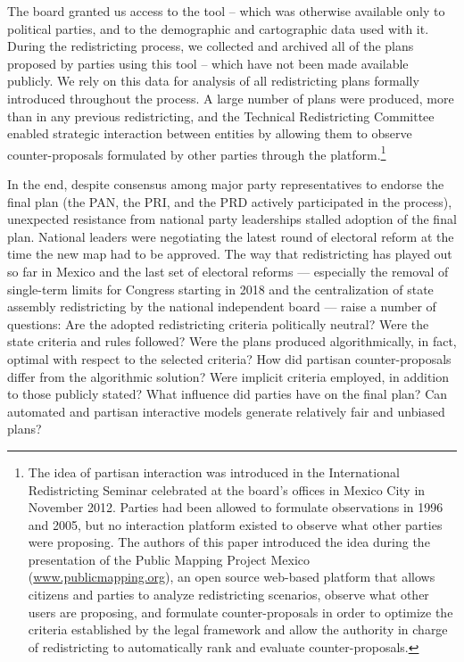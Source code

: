 \documentclass[letter,12pt]{article}
\begin{document}
The board granted us access to the tool -- which was otherwise available only to political parties, and to the demographic and cartographic data used with it. During the redistricting process, we collected and archived all of the plans proposed by parties using this tool -- which have not been made available publicly. We rely on this data for analysis of all redistricting plans formally introduced throughout the process. A large number of plans were produced, more than in any previous redistricting, and the Technical Redistricting Committee enabled strategic interaction between entities by allowing them to observe counter-proposals formulated by other parties through the platform.\footnote{The idea of partisan interaction was introduced in the International Redistricting Seminar celebrated at the board's offices in Mexico City in November 2012. Parties had been allowed to formulate observations in 1996 and 2005, but no interaction platform existed to observe what other parties were proposing. The authors of this paper introduced the idea during the presentation of the Public Mapping Project Mexico (\url{www.publicmapping.org}), an open source web-based platform that allows citizens and parties to analyze redistricting scenarios, observe what other users are proposing, and formulate counter-proposals in order to optimize the criteria established by the legal framework and allow the authority in charge of redistricting to automatically rank and evaluate counter-proposals.} 

In the end, despite consensus among major party representatives to endorse the final plan (the PAN, the PRI, and the PRD actively participated in the process), unexpected resistance from national party leaderships stalled adoption of the final plan. National leaders were negotiating the latest round of electoral reform at the time the new map had to be approved. The way that redistricting has played out so far in Mexico and the last set of electoral reforms --- especially the removal of single-term limits for Congress starting in 2018 and the centralization of state assembly redistricting by the national independent board --- raise a number of questions: Are the adopted redistricting criteria politically neutral? Were the state criteria and rules followed? Were the plans produced algorithmically, in fact, optimal with respect to the selected criteria? How did partisan counter-proposals differ from the algorithmic solution? Were implicit criteria employed, in addition to those publicly stated? What influence did parties have on the final plan? Can automated and partisan interactive  models generate relatively fair and unbiased plans?
\end{document}
